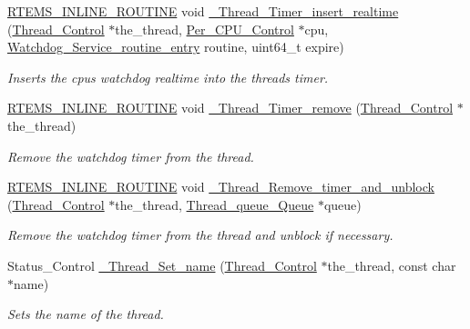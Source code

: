 \begin{DoxyCompactItemize}
\mbox{\hyperlink{group__RTEMSScoreBaseDefs_gac216239df231d5dbd15e3520b0b9313f}{R\+T\+E\+M\+S\+\_\+\+I\+N\+L\+I\+N\+E\+\_\+\+R\+O\+U\+T\+I\+NE}} void \mbox{\hyperlink{group__RTEMSScoreThread_ga21916832cf16bf603f348041e2c04859}{\+\_\+\+Thread\+\_\+\+Timer\+\_\+insert\+\_\+realtime}} (\mbox{\hyperlink{struct__Thread__Control}{Thread\+\_\+\+Control}} $\ast$the\+\_\+thread, \mbox{\hyperlink{structPer__CPU__Control}{Per\+\_\+\+C\+P\+U\+\_\+\+Control}} $\ast$cpu, \mbox{\hyperlink{group__RTEMSScoreWatchdog_ga6ae5e52f6c4046535272c18a8cba66e1}{Watchdog\+\_\+\+Service\+\_\+routine\+\_\+entry}} routine, uint64\+\_\+t expire)
\begin{DoxyCompactList}\small\item\em Inserts the cpu\textquotesingle{}s watchdog realtime into the thread\textquotesingle{}s timer. \end{DoxyCompactList}\item 
\mbox{\hyperlink{group__RTEMSScoreBaseDefs_gac216239df231d5dbd15e3520b0b9313f}{R\+T\+E\+M\+S\+\_\+\+I\+N\+L\+I\+N\+E\+\_\+\+R\+O\+U\+T\+I\+NE}} void \mbox{\hyperlink{group__RTEMSScoreThread_ga8483d8009fe0047a5a48de4a5f6f2ad7}{\+\_\+\+Thread\+\_\+\+Timer\+\_\+remove}} (\mbox{\hyperlink{struct__Thread__Control}{Thread\+\_\+\+Control}} $\ast$the\+\_\+thread)
\begin{DoxyCompactList}\small\item\em Remove the watchdog timer from the thread. \end{DoxyCompactList}\item 
\mbox{\hyperlink{group__RTEMSScoreBaseDefs_gac216239df231d5dbd15e3520b0b9313f}{R\+T\+E\+M\+S\+\_\+\+I\+N\+L\+I\+N\+E\+\_\+\+R\+O\+U\+T\+I\+NE}} void \mbox{\hyperlink{group__RTEMSScoreThread_ga02f96739e7d43b6203c1486f82349c93}{\+\_\+\+Thread\+\_\+\+Remove\+\_\+timer\+\_\+and\+\_\+unblock}} (\mbox{\hyperlink{struct__Thread__Control}{Thread\+\_\+\+Control}} $\ast$the\+\_\+thread, \mbox{\hyperlink{structThread__queue__Queue}{Thread\+\_\+queue\+\_\+\+Queue}} $\ast$queue)
\begin{DoxyCompactList}\small\item\em Remove the watchdog timer from the thread and unblock if necessary. \end{DoxyCompactList}\item 
Status\+\_\+\+Control \mbox{\hyperlink{group__RTEMSScoreThread_gae0a3305be3f9998f42871700abf9f89d}{\+\_\+\+Thread\+\_\+\+Set\+\_\+name}} (\mbox{\hyperlink{struct__Thread__Control}{Thread\+\_\+\+Control}} $\ast$the\+\_\+thread, const char $\ast$name)
\begin{DoxyCompactList}\small\item\em Sets the name of the thread. \end{DoxyCompactList}\item 

\end{DoxyCompactItemize}

